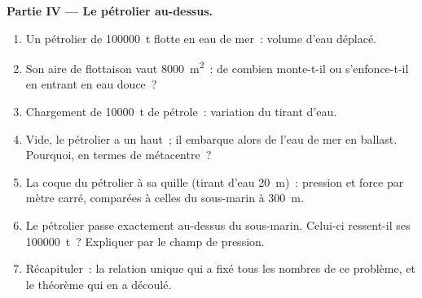 \begin{problem}
\medskip
\noindent\textbf{Partie IV --- Le pétrolier au-dessus.}
\begin{enumerate}[resume]
  \item Un pétrolier de \qty{100000}{t} flotte en eau de mer~: volume d'eau
        déplacé.
  \item Son aire de flottaison vaut \qty{8000}{m^2}~: de combien monte-t-il
        ou s'enfonce-t-il en entrant en eau douce~?
  \item Chargement de \qty{10000}{t} de pétrole~: variation du tirant d'eau.
  \item Vide, le pétrolier a un  haut~; il embarque alors de
        l'eau de mer en ballast. Pourquoi, en termes de métacentre~?
  \item La coque du pétrolier à sa quille (tirant d'eau \qty{20}{m})~:
        pression et force par mètre carré, comparées à celles du sous-marin
        à \qty{300}{m}.
  \item Le pétrolier passe exactement au-dessus du sous-marin. Celui-ci
        ressent-il ses \qty{100000}{t}~? Expliquer par le champ de pression.
  \item Récapituler~: la relation unique qui a fixé tous les nombres de ce
        problème, et le théorème qui en a découlé.
\end{enumerate}
\end{problem}
